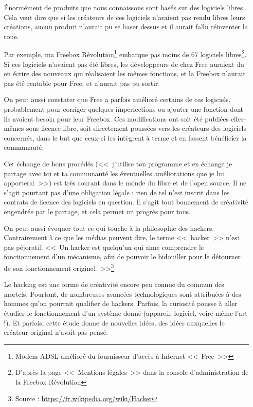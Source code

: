 Énormément de produits que nous connaissons sont basés sur des logiciels libres.
Cela veut dire que si les créateurs de ces logiciels n'avaient pas rendu libres leurs créations, aucun produit n'aurait pu se baser dessus et il aurait fallu réinventer la roue.

Par exemple, ma Freebox Révolution\footnote{Modem ADSL amélioré du fournisseur d'accès à Internet <<~Free~>>} embarque pas moins de 67 logiciels libres\footnote{D'après la page <<~Mentions légales~>> dans la console d'administration de la Freebox Révolution}.
Si ces logiciels n'avaient pas été libres, les développeurs de chez Free auraient du en écrire des nouveaux qui réalisaient les mêmes fonctions, et la Freebox n'aurait pas été rentable pour Free, et n'aurait pas pu sortir.

On peut aussi constater que Free a parfois amélioré certains de ces logiciels, probablement pour corriger quelques imperfections ou ajouter une fonction dont ils avaient besoin pour leur Freebox.
Ces modifications ont soit été publiées elles-mêmes sous licence libre, soit directement poussées vers les créateurs des logiciels concernés, dans le but que ceux-ci les intègrent à terme et en fassent bénéficier la communauté.

Cet échange de bons procédés (<<~j'utilise ton programme et en échange je partage avec toi et ta communauté les éventuelles améliorations que je lui apporterai~>>) est très courant dans le monde du libre et de l'open source.
Il ne s'agit pourtant pas d'une obligation légale : rien de tel n'est inscrit dans les contrats de licence des logiciels en question.
Il s'agit tout bonnement de créativité engendrée par le partage, et cela permet un progrès pour tous.

On peut aussi évoquer tout ce qui touche à la philosophie des hackers.
Contrairement à ce que les médias peuvent dire, le terme <<~hacker~>> n'est pas péjoratif.
<<~Un hacker est quelqu'un qui aime comprendre le fonctionnement d'un mécanisme, afin de pouvoir le bidouiller pour le détourner de son fonctionnement originel.~>>\footnote{Source : \url{https://fr.wikipedia.org/wiki/Hacker}}

Le hacking est une forme de créativité encore peu connue du commun des mortels.
Pourtant, de nombreuses avancées technologiques sont attribuées à des hommes qu'on pourrait qualifier de hackers.
Parfois, la curiosité pousse à aller étudier le fonctionnement d'un système donné (appareil, logiciel, voire même l'art !).
Et parfois, cette étude donne de nouvelles idées, des idées auxquelles le créateur original n'avait pas pensé.

